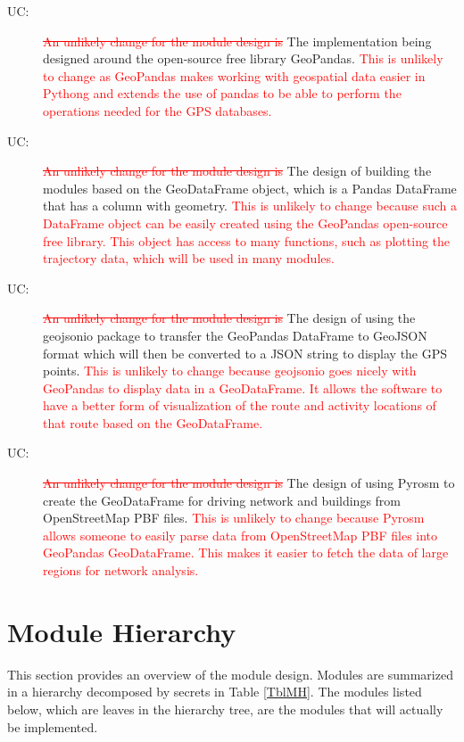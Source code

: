 \documentclass[12pt, titlepage]{article}
\newcounter{ucnum}
\newcommand{\uctheucnum}{UC\theucnum}
\begin{document}
\begin{description}
\item[ \uctheucnum \label{ucGPD}:] \textcolor{red}{\sout{An unlikely change for the module design is }} The implementation being designed around the open-source free library GeoPandas. \textcolor{red}{This is unlikely to change as GeoPandas makes working with geospatial data easier in Pythong and extends the use of pandas to be able to perform the operations needed for the GPS databases.}
\item [ \uctheucnum \label{ucGDF}:] \textcolor{red}{\sout{An unlikely change for the module design is }} The design of building the modules based on the GeoDataFrame object, which is a Pandas DataFrame that has a column with geometry. \textcolor{red}{This is unlikely to change because such a DataFrame object can be easily created using the GeoPandas open-source free library. This object has access to many functions, such as plotting the trajectory data, which will be used in many modules.}
\item [ \uctheucnum \label{ucP}:] \textcolor{red}{\sout{An unlikely change for the module design is }} The design of using the geojsonio package to transfer the GeoPandas DataFrame to GeoJSON format which will then be converted to a JSON string to display the GPS points. \textcolor{red}{This is unlikely to change because geojsonio goes nicely with GeoPandas to display data in a GeoDataFrame. It allows the software to have a better form of visualization of the route and activity locations of that route based on the GeoDataFrame.}
\item [ \uctheucnum \label{ucOSMNDR}:] \textcolor{red}{\sout{An unlikely change for the module design is }} The design of using Pyrosm to create the GeoDataFrame for driving network and buildings from OpenStreetMap PBF files. \textcolor{red}{This is unlikely to change because Pyrosm allows someone to easily parse data from OpenStreetMap PBF files into GeoPandas GeoDataFrame. This makes it easier to fetch the data of large regions for network analysis.}
\end{description}

\section{Module Hierarchy} \label{SecMH}

This section provides an overview of the module design. Modules are summarized
in a hierarchy decomposed by secrets in Table \ref{TblMH}. The modules listed
below, which are leaves in the hierarchy tree, are the modules that will
actually be implemented.
\end{document}
